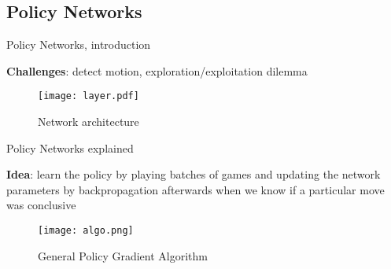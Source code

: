 \documentclass{beamer}
\begin{document}
\subsection{Policy Networks}

\begin{frame}{Policy Networks, introduction}

\textbf{Challenges}: detect motion, exploration/exploitation dilemma




\begin{figure}[!htpb]
\centering
\texttt{[image: layer.pdf]}
\caption{Network architecture}
\label{network}
\end{figure}

\end{frame} 

\begin{frame}{Policy Networks explained}

\textbf{Idea}: learn the policy by playing batches of games and updating the network parameters by backpropagation afterwards when we know if a particular move was conclusive 
 

\begin{figure}[!htpb]
\centering
\texttt{[image: algo.png]}
\caption{General Policy Gradient Algorithm}
\label{algo}
\end{figure}

\end{frame}
\end{document}
